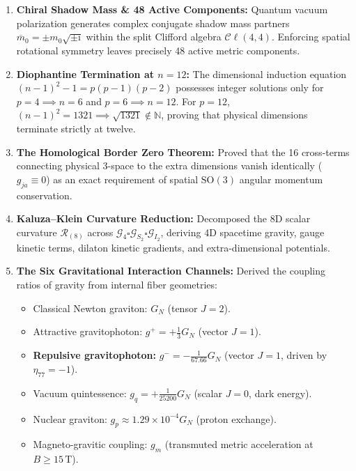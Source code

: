 \documentclass[
    12pt,
    a4paper,
    headings=normal,
    twoside=false,
    open=any,
    parskip=half
]{scrbook}
\newcommand{\iu}{\mathrm{i}}
\begin{document}
\begin{tcolorbox}[colback=maincolor!3!white, colframe=maincolor!80!black, title={\textbf{Grand Synthesis of Chapter 10}}]
\begin{enumerate}[leftmargin=1.5em, itemsep=5pt]
    \item \textbf{Chiral Shadow Mass \& 48 Active Components:} Quantum vacuum polarization generates complex conjugate shadow mass partners $\overline{m}_0 = \pm m_0 \sqrt{\pm \iu}$ within the split Clifford algebra $\mathcal{C}\ell(4,4)$. Enforcing spatial rotational symmetry leaves precisely 48 active metric components.
    \item \textbf{Diophantine Termination at $n = 12$:} The dimensional induction equation $(n-1)^2 - 1 = p(p-1)(p-2)$ possesses integer solutions only for $p = 4 \implies n = 6$ and $p = 6 \implies n = 12$. For $p = 12$, $(n-1)^2 = 1321 \implies \sqrt{1321} \notin \mathbb{N}$, proving that physical dimensions terminate strictly at twelve.
    \item \textbf{The Homological Border Zero Theorem:} Proved that the 16 cross-terms connecting physical 3-space to the extra dimensions vanish identically ($g_{ja} \equiv 0$) as an exact requirement of spatial $\mathrm{SO}(3)$ angular momentum conservation.
    \item \textbf{Kaluza--Klein Curvature Reduction:} Decomposed the 8D scalar curvature $\mathcal{R}_{(8)}$ across $\mathcal{G}_4 \square \mathcal{G}_{S_2} \square \mathcal{G}_{I_2}$, deriving 4D spacetime gravity, gauge kinetic terms, dilaton kinetic gradients, and extra-dimensional potentials.
    \item \textbf{The Six Gravitational Interaction Channels:} Derived the coupling ratios of gravity from internal fiber geometries:
    \begin{itemize}[noitemsep]
        \item Classical Newton graviton: $G_N$ (tensor $J = 2$).
        \item Attractive gravitophoton: $g^+ = +\frac{1}{3}G_N$ (vector $J = 1$).
        \item \textbf{Repulsive gravitophoton:} $g^- = -\frac{1}{67.66}G_N$ (vector $J = 1$, driven by $\eta_{77} = -1$).
        \item Vacuum quintessence: $g_q = +\frac{1}{25200}G_N$ (scalar $J = 0$, dark energy).
        \item Nuclear graviton: $g_p \approx 1.29 \times 10^{-4} G_N$ (proton exchange).
        \item Magneto-gravitic coupling: $g_m$ (transmuted metric acceleration at $B \ge 15\,\text{T}$).
    \end{itemize}
\end{enumerate}
\end{tcolorbox}
\end{document}

